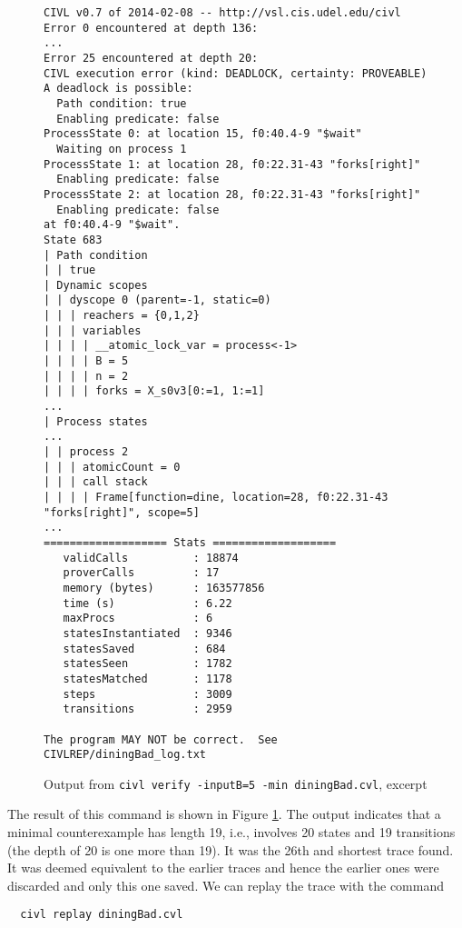 \begin{figure}
  \begin{small}
\begin{verbatim}
CIVL v0.7 of 2014-02-08 -- http://vsl.cis.udel.edu/civl
Error 0 encountered at depth 136:
...
Error 25 encountered at depth 20:
CIVL execution error (kind: DEADLOCK, certainty: PROVEABLE)
A deadlock is possible:
  Path condition: true
  Enabling predicate: false
ProcessState 0: at location 15, f0:40.4-9 "$wait"
  Waiting on process 1
ProcessState 1: at location 28, f0:22.31-43 "forks[right]"
  Enabling predicate: false
ProcessState 2: at location 28, f0:22.31-43 "forks[right]"
  Enabling predicate: false
at f0:40.4-9 "$wait".
State 683
| Path condition
| | true
| Dynamic scopes
| | dyscope 0 (parent=-1, static=0)
| | | reachers = {0,1,2}
| | | variables
| | | | __atomic_lock_var = process<-1>
| | | | B = 5
| | | | n = 2
| | | | forks = X_s0v3[0:=1, 1:=1]
...
| Process states
...
| | process 2
| | | atomicCount = 0
| | | call stack
| | | | Frame[function=dine, location=28, f0:22.31-43 "forks[right]", scope=5]
...
=================== Stats ===================
   validCalls          : 18874
   proverCalls         : 17
   memory (bytes)      : 163577856
   time (s)            : 6.22
   maxProcs            : 6
   statesInstantiated  : 9346
   statesSaved         : 684
   statesSeen          : 1782
   statesMatched       : 1178
   steps               : 3009
   transitions         : 2959

The program MAY NOT be correct.  See CIVLREP/diningBad_log.txt
\end{verbatim}
  \end{small}
  \caption{Output from \texttt{civl verify -inputB=5 -min diningBad.cvl}, excerpt}
  \label{fig:diningOut}
\end{figure}

The result of this command is shown in Figure \ref{fig:diningOut}. The
output indicates that a minimal counterexample has length 19, i.e.,
involves 20 states and 19 transitions (the depth of 20 is one more
than 19).    It was the 26th and shortest trace found.  It was deemed
equivalent to the earlier traces and hence the earlier ones were
discarded and only this one saved.  We can replay the trace with the command
\begin{verbatim}
  civl replay diningBad.cvl
\end{verbatim}

